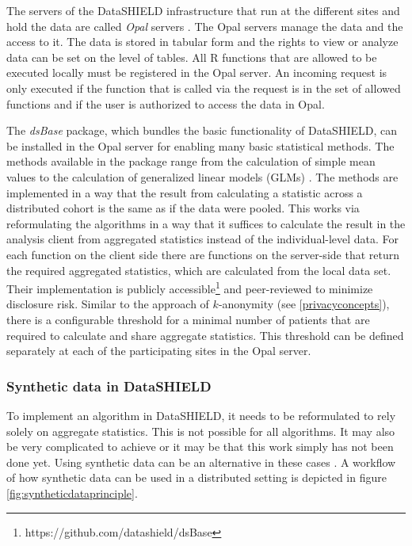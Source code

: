 \documentclass[12pt]{article}
\newcommand{\apkg}[1]{\emph{#1}}
\begin{document}
The servers of the DataSHIELD infrastructure that run at the different sites and hold the data are called {\em Opal} servers \citep{opal}.
The Opal servers manage the data and the access to it.
The data is stored in tabular form and the rights to view or analyze data can be set on the level of tables.
All R functions that are allowed to be executed locally must be registered in the Opal server.
An incoming request is only executed if the function that is called via the request is in the set of allowed functions and if the user is authorized to access the data in Opal.

The \apkg{dsBase} package, which bundles the basic functionality of DataSHIELD, can be installed in the Opal server for enabling many basic statistical methods.
The methods available in the package range from the calculation of simple mean values to the calculation of generalized linear models (GLMs) \citep{wolfson_datashield}.
The methods are implemented in a way that the result from calculating a statistic across a distributed cohort is the same as if the data were pooled.
This works via reformulating the algorithms in a way that it suffices to calculate the result in the analysis client from aggregated statistics instead of the individual-level data.
For each function on the client side there are functions on the server-side that return the required aggregated statistics, which are calculated from the local data set.
Their implementation is publicly accessible\footnote{https://github.com/datashield/dsBase} and peer-reviewed to minimize disclosure risk.
Similar to the approach of $k$-anonymity (see \ref{privacyconcepts}), there is a configurable threshold for a minimal number of patients that are required to calculate and share aggregate statistics.
This threshold can be defined separately at each of the participating sites in the Opal server.

\subsubsection{Synthetic data in DataSHIELD}\label{syntheticdata_ds}

To implement an algorithm in DataSHIELD, it needs to be reformulated to rely solely on aggregate statistics.
This is not possible for all algorithms.
It may also be very complicated to achieve or it may be that this work simply has not been done yet.
Using synthetic data can be an alternative in these cases \citep{bonofiglio2020, manriquevallier_bayesian_2018, synthpop, quick_generating_2018}.
A workflow of how synthetic data can be used in a distributed setting is depicted in figure \ref{fig:syntheticdataprinciple}.
\end{document}
